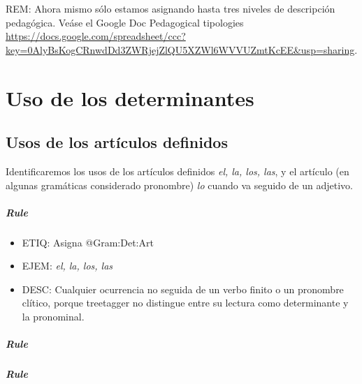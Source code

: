 \documentclass[11pt]{report}
\begin{document}
REM: Ahora mismo sólo estamos asignando hasta tres niveles de descripción pedagógica. Veáse el Google Doc Pedagogical tipologies \url{https://docs.google.com/spreadsheet/ccc?key=0AlyBsKogCRnwdDd3ZWRjejZlQU5XZWl6WVVUZmtKcEE&usp=sharing}.
\chapter{Uso de los determinantes}
\section{Usos de los artículos definidos}
Identificaremos los usos de los artículos definidos \emph{el, la, los, las}, y el artículo (en algunas gramáticas considerado pronombre) \emph{lo} cuando va seguido de un adjetivo.

\paragraph*{Rule}
\begin{itemize}
\item ETIQ: Asigna @Gram:Det:Art
\item EJEM: \emph{el, la, los, las}
\item DESC: Cualquier ocurrencia no seguida de un verbo finito o un pronombre clítico, porque treetagger no distingue entre su lectura como determinante y la pronominal.
\end{itemize}

\paragraph*{Rule}
\paragraph*{Rule}
\end{document}
